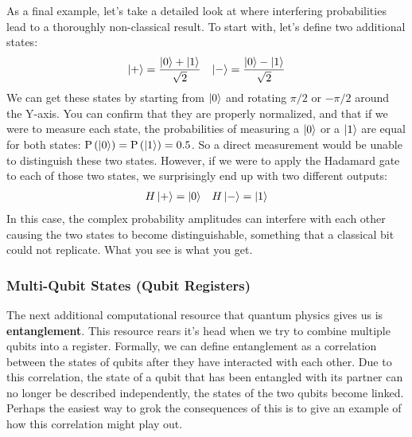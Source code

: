As a final example, let's take a detailed look at where interfering probabilities lead to a thoroughly
non-classical result. To start with, let's define two additional states:
\begin{align}
  \ket{+} = \frac{\ket{0} + \ket{1}}{\sqrt{2}} && \ket{-} = \frac{\ket{0} - \ket{1}}{\sqrt{2}}
\end{align}
We can get these states by starting from $\ket{0}$ and rotating $\pi/2$ or $-\pi/2$ around the Y-axis. You can
confirm that they are properly normalized, and that if we were to measure each state, the
probabilities of measuring a $\ket{0}$ or a $\ket{1}$ are equal for both states: $\mathrm{P}\left(\ket{0}\right) =
\mathrm{P}\left(\ket{1}\right) = 0.5$. So a direct measurement would be unable to distinguish these two states.
However, if we were to apply the Hadamard gate to each of those two states, we surprisingly end up with two
different outputs:
\begin{align}
  H\ket{+} = \ket{0} && H\ket{-} = \ket{1}
\end{align}
In this case, the complex probability amplitudes can interfere with each other causing the two states to
become distinguishable, something that a classical bit could not replicate. What you see is what you get.

\subsubsection{Multi-Qubit States (Qubit Registers)}
The next additional computational resource that quantum physics gives us is \textbf{entanglement}. This
resource rears it's head when we try to combine multiple qubits into a register. Formally,
we can define entanglement as a correlation between the states of qubits after they have interacted
with each other. Due to this correlation, the state of a qubit that has been entangled with its partner
can no longer be described independently, the states of the two qubits become linked. Perhaps the easiest
way to grok the consequences of this is to give an example of how this correlation might play out.

